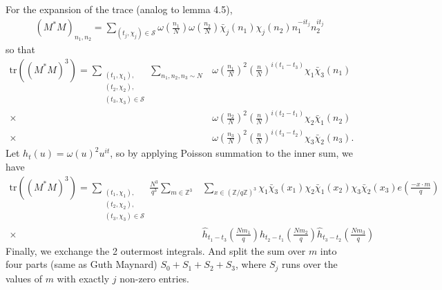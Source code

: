 For the expansion of the trace (analog to lemma 4.5), 
\begin{align*}
    (M^*M)_{n_1,n_2} = \sum_{(t_j,\chi_j)\in \mathcal{S}} \omega\left(\frac{n_1}{N}\right)\omega\left(\frac{n_2}{N}\right)
    \bar{\chi}_j(n_1)\chi_j(n_2)n_1^{-it_j}n_2^{it_j}
\end{align*}
so that \begin{align*}
    \textrm{tr}((M^*M)^3)=\sum_{\substack{(t_1,\chi_1),\\(t_2,\chi_2),\\(t_3,\chi_3)\in\mathcal{S}}}\sum_{n_1,n_2,n_3\sim N} & 
    \omega\left(\frac{n_1}{N}\right)^2 \left(\frac{n}{N}\right)^{i(t_1-t_3)}\chi_1\bar{\chi}_3(n_1)\\
    \times \ &\omega\left(\frac{n_2}{N}\right)^2 \left(\frac{n}{N}\right)^{i(t_2-t_1)}\chi_2\bar{\chi}_1(n_2)\\
    \times \ &\omega\left(\frac{n_3}{N}\right)^2 \left(\frac{n}{N}\right)^{i(t_3-t_2)}\chi_3\bar{\chi}_2(n_3).
\end{align*}
Let $h_t(u)=\omega(u)^2u^{it}$,
so by applying Poisson summation to the inner sum, we have \begin{align*}
    \textrm{tr}((M^*M)^3)=\sum_{\substack{(t_1,\chi_1),\\(t_2,\chi_2),\\(t_3,\chi_3)\in\mathcal{S}}}
    \frac{N^3}{q^3}\sum_{m\in\mathbb{Z}^3}&\sum_{x\in (\mathbb{Z}/q\mathbb{Z})^3}\chi_1\bar{\chi}_3(x_1)\chi_2\bar{\chi}_1(x_2)\chi_3\bar{\chi}_2(x_3) e\left(\frac{-x\cdot m}{q}\right)\\
    \times \ &\hat{h}_{t_1-t_3}\left(\frac{Nm_1}{q}\right)\hat{h}_{t_2-t_1}\left(\frac{Nm_2}{q}\right)\hat{h}_{t_3-t_2}\left(\frac{Nm_3}{q}\right) 
\end{align*}
Finally, we exchange the 2 outermost integrals. And split the sum over $m$ into four parts (same as Guth Maynard) $S_0+ S_1+S_2+S_3$,
where $S_j$ runs over the values of $m$ with exactly $j$ non-zero entries.
